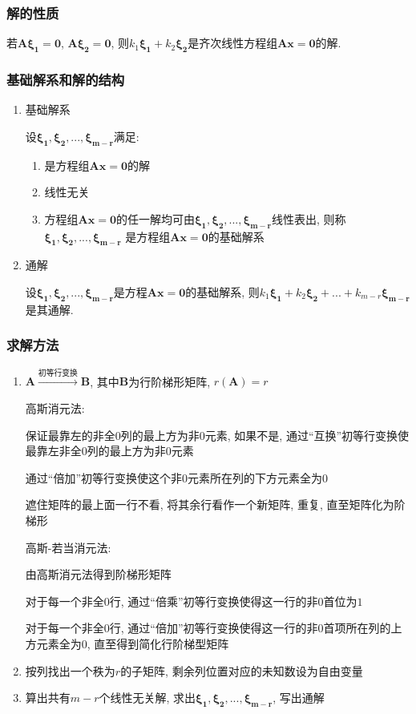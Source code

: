 \subsubsection{解的性质}
若$ \bm{A}\bm{\xi_{1}}=\bm{0} $, $ \bm{A}\bm{\xi_{2}}=\bm{0} $, 则$ k_{1}\bm{\xi_{1}}+k_{2}\bm{\xi_{2}} $是齐次线性方程组$ \bm{A}\bm{x}=\bm{0} $的解.
\subsubsection{基础解系和解的结构}
\begin{enumerate}
\item 基础解系\par
设$ \bm{\xi_{1}},\bm{\xi_{2}},...,\bm{\xi_{m-r}} $满足:
\begin{enumerate}
\item 是方程组$ \bm{A}\bm{x}=\bm{0} $的解
\item 线性无关
\item 方程组$ \bm{A}\bm{x}=\bm{0} $的任一解均可由$ \bm{\xi_{1}},\bm{\xi_{2}},...,\bm{\xi_{m-r}} $线性表出, 则称$ \bm{\xi_{1}},\bm{\xi_{2}},...,\bm{\xi_{m-r}} $ 是方程组$ \bm{A}\bm{x}=\bm{0} $的基础解系
\end{enumerate}
\item 通解\par
设$ \bm{\xi_{1}},\bm{\xi_{2}},...,\bm{\xi_{m-r}} $是方程$ \bm{A}\bm{x}=\bm{0} $的基础解系, 则$ k_{1}\bm{\xi_{1}}+k_{2}\bm{\xi_{2}}+...+k_{m-r}\bm{\xi_{m-r}} $是其通解.
\end{enumerate}
\subsubsection{求解方法}\label{齐次线性方程组求解方法}
\begin{enumerate}
\item $ \bm{A}\xrightarrow{\text{初等行变换}}\bm{B} $, 其中$ \bm{B} $为行阶梯形矩阵, $ r(\bm{A})=r $\par
高斯消元法: \par
{} 保证最靠左的非全$ 0 $列的最上方为非$ 0 $元素, 如果不是, 通过``互换''初等行变换使最靠左非全$ 0 $列的最上方为非$ 0 $元素\par
{} 通过``倍加''初等行变换使这个非$ 0 $元素所在列的下方元素全为$ 0 $\par
{} 遮住矩阵的最上面一行不看, 将其余行看作一个新矩阵, 重复, 直至矩阵化为阶梯形\par
高斯-若当消元法:\par
{} 由高斯消元法得到阶梯形矩阵\par
{} 对于每一个非全$ 0 $行, 通过``倍乘''初等行变换使得这一行的非$ 0 $首位为$ 1 $\par
{} 对于每一个非全$ 0 $行, 通过``倍加''初等行变换使得这一行的非$ 0 $首项所在列的上方元素全为$ 0 $, 直至得到简化行阶梯型矩阵
\item 按列找出一个秩为$ r $的子矩阵, 剩余列位置对应的未知数设为自由变量
\item 算出共有$ m-r $个线性无关解, 求出$ \bm{\xi_{1}},\bm{\xi_{2}},...,\bm{\xi_{m-r}} $, 写出通解
\end{enumerate}
